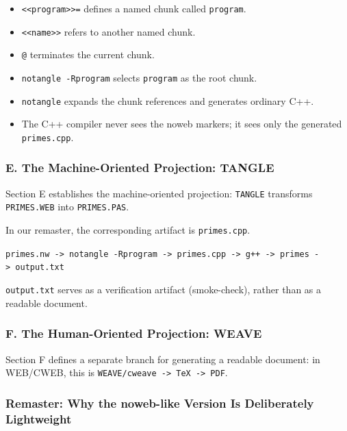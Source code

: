 \documentclass{ZGJournalArticle_2026}
\providecommand{\tightlist}{%
  \setlength{\itemsep}{0pt}\setlength{\parskip}{0pt}}
\begin{document}
\begin{itemize}
\tightlist
\item
  \texttt{\textless{}\textless{}program\textgreater{}\textgreater{}=}
  defines a named chunk called \texttt{program}.
\item
  \texttt{\textless{}\textless{}name\textgreater{}\textgreater{}} refers
  to another named chunk.
\item
  \texttt{@} terminates the current chunk.
\item
  \texttt{notangle\ -Rprogram} selects \texttt{program} as the root
  chunk.
\item
  \texttt{notangle} expands the chunk references and generates ordinary
  C++.
\item
  The C++ compiler never sees the noweb markers; it sees only the
  generated \texttt{primes.cpp}.
\end{itemize}

\subsubsection{E. The Machine-Oriented Projection:
TANGLE}\label{e.-the-machine-oriented-projection-tangle}

Section E establishes the machine-oriented projection: \texttt{TANGLE}
transforms \texttt{PRIMES.WEB} into \texttt{PRIMES.PAS}.

In our remaster, the corresponding artifact is \texttt{primes.cpp}.

\texttt{primes.nw\ -\textgreater{}\ notangle\ -Rprogram\ -\textgreater{}\ primes.cpp\ -\textgreater{}\ g++\ -\textgreater{}\ primes\ -\textgreater{}\ output.txt}

\texttt{output.txt} serves as a verification artifact (smoke-check),
rather than as a readable document.

\subsubsection{F. The Human-Oriented Projection:
WEAVE}\label{f.-the-human-oriented-projection-weave}

Section F defines a separate branch for generating a readable document:
in WEB/CWEB, this is
\texttt{WEAVE/cweave\ -\textgreater{}\ TeX\ -\textgreater{}\ PDF}.

\subsubsection{Remaster: Why the noweb-like Version Is Deliberately
Lightweight}\label{remaster-why-the-noweb-like-version-is-deliberately-lightweight}
\end{document}
